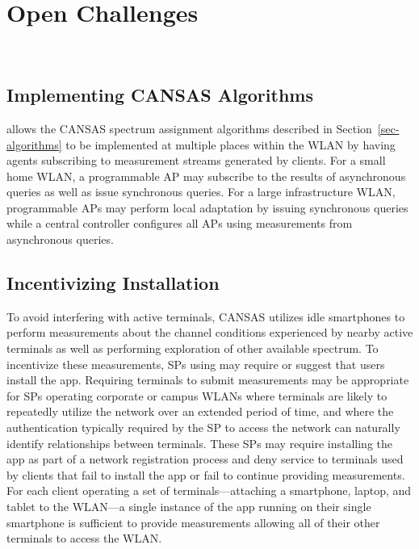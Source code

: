 \section{Open Challenges}
\label{sec-challenges}

\\

\subsection{Implementing CANSAS Algorithms}

\PS{} allows the CANSAS spectrum assignment algorithms described in
Section~\ref{sec-algorithms} to be implemented at multiple places within the
WLAN by having agents subscribing to measurement streams generated by \PS{}
clients. For a small home WLAN, a programmable AP may subscribe to the results
of asynchronous queries as well as issue synchronous queries.  For a large
infrastructure WLAN, programmable APs may perform local adaptation by issuing
synchronous queries while a central controller configures all APs using
measurements from asynchronous queries.


\subsection{Incentivizing Installation}

To avoid interfering with active terminals, CANSAS utilizes idle smartphones
to perform measurements about the channel conditions experienced by nearby
active terminals as well as performing exploration of other available
spectrum. To incentivize these measurements, SPs using \PS{} may
require or suggest that users install the \PS{} app. Requiring
terminals to submit measurements may be appropriate for SPs operating
corporate or campus WLANs where terminals are likely to repeatedly utilize
the network over an extended period of time, and where the authentication
typically required by the SP to access the network can naturally identify
relationships between terminals. These SPs may require installing the
\PS{} app as part of a network registration process and deny service
to terminals used by clients that fail to install the app or fail to continue
providing measurements. For each client operating a set of
terminals---attaching a smartphone, laptop, and tablet to the \PS{}
WLAN---a single instance of the \PS{} app running on their single
smartphone is sufficient to provide measurements allowing all of their other
terminals to access the WLAN.

